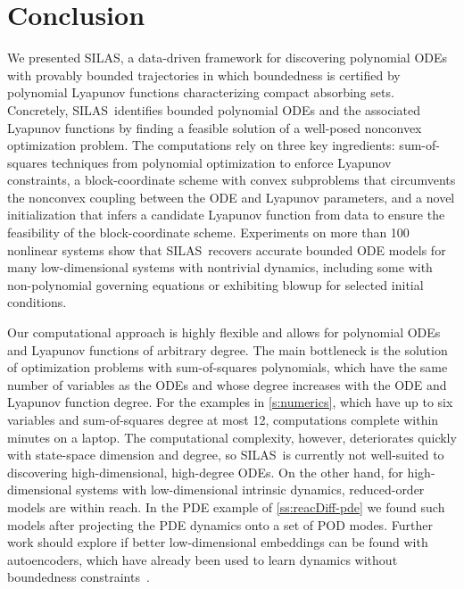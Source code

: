 \documentclass[11pt]{amsart}
\numberwithin{equation}{section}
\theoremstyle{plain}
\theoremstyle{definition}
\theoremstyle{remark}
\newcommand{\methodname}{{SILAS}}
\begin{document}
\section{Conclusion}\label{s:conclusion}

We presented \methodname, a data-driven framework for discovering polynomial ODEs with provably bounded trajectories in which boundedness is certified by polynomial Lyapunov functions characterizing compact absorbing sets. Concretely, \methodname\ identifies bounded polynomial ODEs and the associated Lyapunov functions by finding a feasible solution of a well-posed nonconvex optimization problem. The computations rely on three key ingredients: sum-of-squares techniques from polynomial optimization to enforce Lyapunov constraints, a block-coordinate scheme with convex subproblems that circumvents the nonconvex coupling between the ODE and Lyapunov parameters, and a novel initialization that infers a candidate Lyapunov function from data to ensure the feasibility of the block-coordinate scheme. Experiments on more than 100 nonlinear systems show that \methodname\ recovers accurate bounded ODE models for many low-dimensional systems with nontrivial dynamics, including some with non-polynomial governing equations or exhibiting blowup for selected initial conditions.

Our computational approach is highly flexible and allows for polynomial ODEs and Lyapunov functions of arbitrary degree. The main bottleneck is the solution of optimization problems with sum-of-squares polynomials, which have the same number of variables as the ODEs and whose degree increases with the ODE and Lyapunov function degree. For the examples in \cref{s:numerics}, which have up to six variables and sum-of-squares degree at most 12, computations complete within minutes on a laptop. The computational complexity, however, deteriorates quickly with state-space dimension and degree, so \methodname\ is currently not well-suited to discovering high-dimensional, high-degree ODEs. On the other hand, for high-dimensional systems with low-dimensional intrinsic dynamics, reduced-order models are within reach. In the PDE example of \cref{ss:reacDiff-pde} we found such models after projecting the PDE dynamics onto a set of POD modes. Further work should explore if better low-dimensional embeddings can be found with autoencoders, which have already been used to learn dynamics without boundedness constraints~\cite{Bramburger2021}. 
\end{document}
